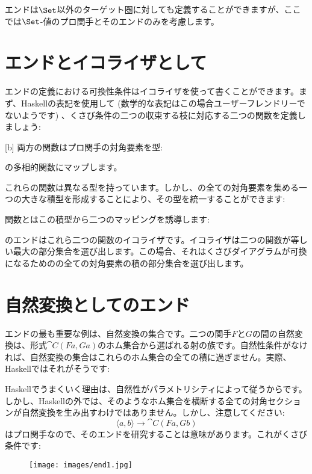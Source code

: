 エンドは$\Set$以外のターゲット圏に対しても定義することができますが、ここでは$\Set$-値のプロ関手とそのエンドのみを考慮します。

\section{エンドとイコライザとして}

エンドの定義における可換性条件はイコライザを使って書くことができます。まず、Haskellの表記を使用して (数学的な表記はこの場合ユーザーフレンドリーでないようです) 、くさび条件の二つの収束する枝に対応する二つの関数を定義しましょう: 

[b]
両方の関数はプロ関手の対角要素を型: 

の多相的関数にマップします。

これらの関数は異なる型を持っています。しかし、の全ての対角要素を集める一つの大きな積型を形成することにより、その型を統一することができます: 

関数とはこの積型から二つのマッピングを誘導します: 

のエンドはこれら二つの関数のイコライザです。イコライザは二つの関数が等しい最大の部分集合を選び出します。この場合、それはくさびダイアグラムが可換になるためのの全ての対角要素の積の部分集合を選び出します。

\section{自然変換としてのエンド}

エンドの最も重要な例は、自然変換の集合です。二つの関手$F$と$G$の間の自然変換は、形式$\cat{C}(F a, G a)$のホム集合から選ばれる射の族です。自然性条件がなければ、自然変換の集合はこれらのホム集合の全ての積に過ぎません。実際、Haskellではそれがそうです: 

Haskellでうまくいく理由は、自然性がパラメトリシティによって従うからです。しかし、Haskellの外では、そのようなホム集合を横断する全ての対角セクションが自然変換を生み出すわけではありません。しかし、注意してください: 
\[\langle a, b \rangle \to \cat{C}(F a, G b)\]
はプロ関手なので、そのエンドを研究することは意味があります。これがくさび条件です: 

\begin{figure}[H]
  \centering
  \texttt{[image: images/end1.jpg]}
\end{figure}

